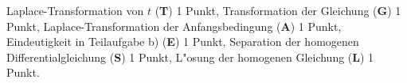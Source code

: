 \begin{bewertung}
Laplace-Transformation von $t$ ({\bf T}) 1 Punkt,
Transformation der Gleichung ({\bf G}) 1 Punkt,
Laplace-Transformation der Anfangsbedingung ({\bf A}) 1 Punkt,
Eindeutigkeit in Teilaufgabe b) ({\bf E}) 1 Punkt,
Separation der homogenen Differentialgleichung ({\bf S}) 1 Punkt,
L"osung der homogenen Gleichung ({\bf L}) 1 Punkt.
\end{bewertung}
